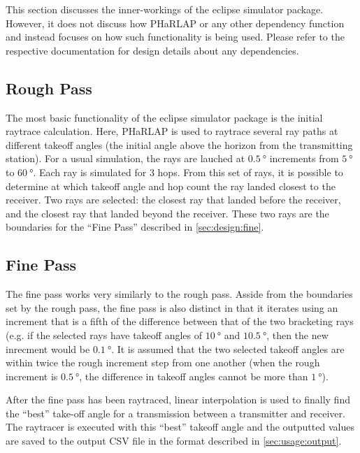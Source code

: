 \documentclass[12pt,letterpaper]{article}
\begin{document}
This section discusses the inner-workings of the eclipse simulator
package. However, it does not discuss how PHaRLAP or any other dependency
function and instead focuses on how such functionality is being used. Please
refer to the respective documentation for design details about any dependencies.

\subsection{Rough Pass}
\label{sec:design:rough}

The most basic functionality of the eclipse simulator package is the initial
raytrace calculation. Here, PHaRLAP is used to raytrace several ray paths at
different takeoff angles (the initial angle above the horizon from the
transmitting station). For a usual simulation, the rays are lauched at
$\SI{0.5}{\degree}$ increments from $\SI{5}{\degree}$ to
$\SI{60}{\degree}$. Each ray is simulated for 3 hops. From this set of rays, it
is possible to determine at which takeoff angle and hop count the ray landed
closest to the receiver. Two rays are selected: the closest ray that landed
before the receiver, and the closest ray that landed beyond the receiver. These
two rays are the boundaries for the ``Fine Pass'' described in
\autoref{sec:design:fine}.

\subsection{Fine Pass}
\label{sec:design:fine}

The fine pass works very similarly to the rough pass. Asside from the boundaries
set by the rough pass, the fine pass is also distinct in that it iterates using
an increment that is a fifth of the difference between that of the two
bracketing rays (e.g. if the selected rays have takeoff angles of
$\SI{10}{\degree}$ and $\SI{10.5}{\degree}$, then the new inrecment would be
$\SI{0.1}{\degree}$. It is assumed that the two selected takeoff angles are
within twice the rough increment step from one another (when the rough increment
is $\SI{0.5}{\degree}$, the difference in takeoff angles cannot be more than
$\SI{1}{\degree}$).

After the fine pass has been raytraced, linear interpolation is used to finally
find the ``best'' take-off angle for a transmission between a transmitter and
receiver. The raytracer is executed with this ``best'' takeoff angle and the
outputted values are saved to the output CSV file in the format described in
\autoref{sec:usage:output}.
\end{document}
